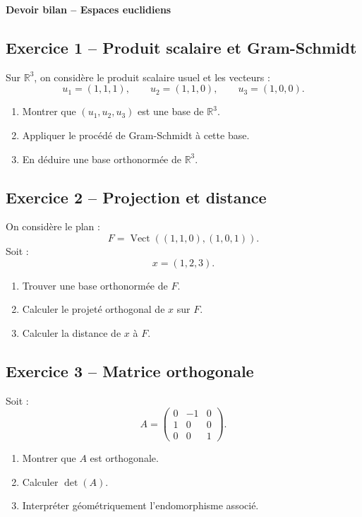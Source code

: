 \documentclass[11pt,a4paper]{article}
\newcommand{\R}{\mathbb R}
\newcommand{\Vect}{\operatorname{Vect}}
\begin{document}
\begin{center}
\Large\textbf{Devoir bilan -- Espaces euclidiens}
\end{center}

\subsection*{Exercice 1 -- Produit scalaire et Gram-Schmidt}

Sur \(\R^3\), on considère le produit scalaire usuel et les vecteurs :
\[
u_1=(1,1,1),
\qquad
u_2=(1,1,0),
\qquad
u_3=(1,0,0).
\]

\begin{enumerate}
    \item Montrer que \((u_1,u_2,u_3)\) est une base de \(\R^3\).
    \item Appliquer le procédé de Gram-Schmidt à cette base.
    \item En déduire une base orthonormée de \(\R^3\).
\end{enumerate}

\subsection*{Exercice 2 -- Projection et distance}

On considère le plan :
\[
F=\Vect((1,1,0),(1,0,1)).
\]
Soit :
\[
x=(1,2,3).
\]

\begin{enumerate}
    \item Trouver une base orthonormée de \(F\).
    \item Calculer le projeté orthogonal de \(x\) sur \(F\).
    \item Calculer la distance de \(x\) à \(F\).
\end{enumerate}

\subsection*{Exercice 3 -- Matrice orthogonale}

Soit :
\[
A=
\begin{pmatrix}
0&-1&0\\
1&0&0\\
0&0&1
\end{pmatrix}.
\]

\begin{enumerate}
    \item Montrer que \(A\) est orthogonale.
    \item Calculer \(\det(A)\).
    \item Interpréter géométriquement l'endomorphisme associé.
\end{enumerate}
\end{document}
